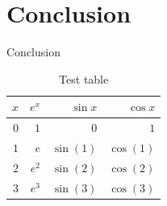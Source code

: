 \documentclass[aspectratio=169]{beamer}
\begin{document}
  \section{Conclusion}
    \begin{frame}{Conclusion}
      \begin{table}[H]
        \caption{Test table}
        \center
        \begin{tabular}{rrrr}
          \hline
          $x$ & $e^x$ & $\sin x$ & $\cos x$ \\
          \hline
          \hline
          $0$ & $1$ & $0$ & $1$ \\
          $1$ & $e$ & $\sin(1)$ & $\cos(1)$ \\
          $2$ & $e^2$ & $\sin(2)$ & $\cos(2)$ \\
          $3$ & $e^3$ & $\sin(3)$ & $\cos(3)$ \\
          \hline
        \end{tabular}
      \end{table}
    \end{frame}
\end{document}
